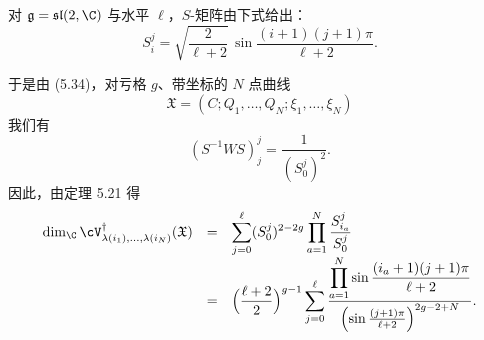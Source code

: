 
\begin{example}[5.23]
对 $\mathfrak g=\mathfrak{sl}(2,\C)$ 与水平 $\ell$，$S$-矩阵由下式给出：
\begin{equation}
S^j_i=\sqrt{\frac{2}{\ell+2}}\,\sin\frac{(i+1)(j+1)\pi}{\ell+2}. \tag{5.39}
\end{equation}
\end{example}
于是由 (5.34)，对亏格 $g$、带坐标的 $N$ 点曲线
\[
\mathfrak X=(C;Q_1,\dots,Q_N;\xi_1,\dots,\xi_N)
\]
我们有
\[
(S^{-1}WS)^j_j=\frac{1}{(S^j_0)^2}.
\]
因此，由定理 5.21 得
\[
\begin{array}{rcl}
\dim_{\C}\cV^\dagger_{\lambda(i_1),\dots,\lambda(i_N)}(\mathfrak X)
&=&\displaystyle\sum_{j=0}^{\ell}(S^j_0)^{2-2g}\prod_{a=1}^{N}\frac{S^j_{i_a}}{S^j_0}\\[10pt]
&=&\displaystyle\Bigl(\frac{\ell+2}{2}\Bigr)^{g-1}
\sum_{j=0}^{\ell}
\frac{\displaystyle\prod_{a=1}^{N}\sin\frac{(i_a+1)(j+1)\pi}{\ell+2}}
{\Bigl(\sin\frac{(j+1)\pi}{\ell+2}\Bigr)^{2g-2+N}}.
\end{array}
\]



